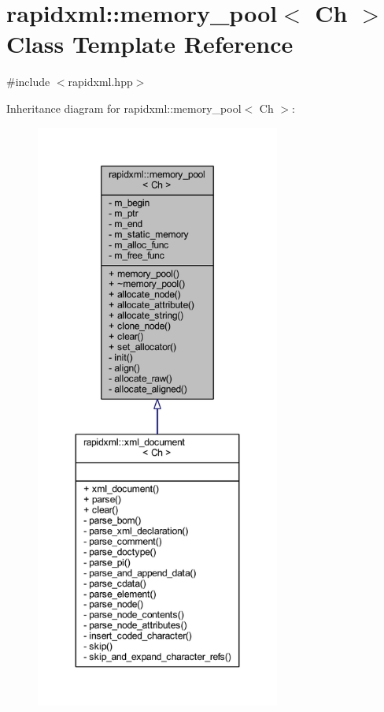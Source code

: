 \hypertarget{classrapidxml_1_1memory__pool}{\section{rapidxml\+:\+:memory\+\_\+pool$<$ Ch $>$ Class Template Reference}
\label{classrapidxml_1_1memory__pool}
}


{\ttfamily \#include $<$rapidxml.\+hpp$>$}



Inheritance diagram for rapidxml\+:\+:memory\+\_\+pool$<$ Ch $>$\+:\nopagebreak
\begin{figure}[H]
\begin{center}
\leavevmode
\includegraphics[height=550pt]{classrapidxml_1_1memory__pool__inherit__graph}
\end{center}
\end{figure}


